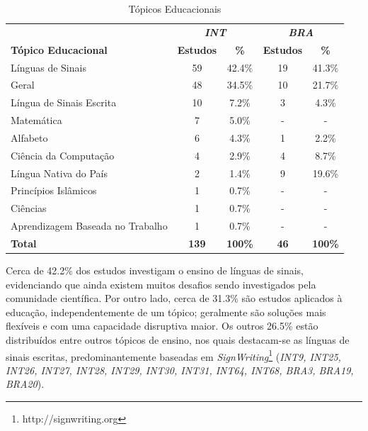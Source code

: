 \begin{table}[htbp]
\caption{Tópicos Educacionais}
\label{results:table:educational-topics}
\centering
\begin{tabular}{lcccc}
\hline
                                 & \multicolumn{2}{c}{\textit{\textbf{INT}}} & \multicolumn{2}{c}{\textit{\textbf{BRA}}} \\ \cline{2-5} 
\textbf{Tópico Educacional}      & \textbf{Estudos}      & \textbf{\%}        & \textbf{Estudos}      & \textbf{\%}        \\ \hline
Línguas de Sinais                & 59                    & 42.4\%             & 19                    & 41.3\%             \\ 
Geral                            & 48                    & 34.5\%             & 10                    & 21.7\%             \\ 
Língua de Sinais Escrita         & 10                    & 7.2\%              & 3                     & 4.3\%              \\ 
Matemática                       & 7                     & 5.0\%              & -                     & -                  \\ 
Alfabeto                         & 6                     & 4.3\%              & 1                     & 2.2\%              \\ 
Ciência da Computação            & 4                     & 2.9\%              & 4                     & 8.7\%              \\ 
Língua Nativa do País            & 2                     & 1.4\%              & 9                     & 19.6\%             \\ 
Princípios Islâmicos             & 1                     & 0.7\%              & -                     & -                  \\ 
Ciências                         & 1                     & 0.7\%              & -                     & -                  \\ 
Aprendizagem Baseada no Trabalho & 1                     & 0.7\%              & -                     & -                  \\ 
\textbf{Total}                   & \textbf{139}          & \textbf{100\%}     & \textbf{46}           & \textbf{100\%}     \\ \hline
\end{tabular}
\fautor
\end{table}

Cerca de 42.2\% dos estudos investigam o ensino de línguas de sinais, evidenciando que ainda existem muitos desafios sendo investigados pela comunidade científica. Por outro lado, cerca de 31.3\% são estudos aplicados à educação, independentemente de um tópico; geralmente são soluções mais flexíveis e com uma capacidade disruptiva maior. Os outros 26.5\% estão distribuídos entre outros tópicos de ensino, nos quais destacam-se as línguas de sinais escritas, predominantemente baseadas em \textit{SignWriting}\footnote{http://signwriting.org} (\textit{INT9, INT25, INT26, INT27, INT28, INT29, INT30, INT31, INT64, INT68, BRA3, BRA19, BRA20}).

